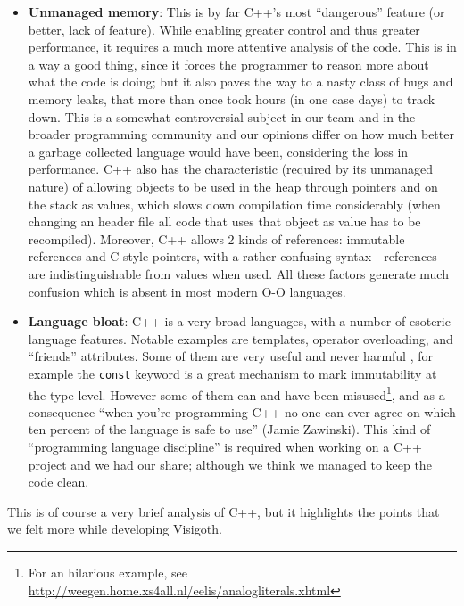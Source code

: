 \documentclass[a4paper,11pt,titlepage]{article}
\newcommand{\code}[1]{\texttt{#1}}
\begin{document}
\begin{itemize}

\item
  \textbf{Unmanaged memory}: This is by far C++'s most ``dangerous'' feature (or
  better, lack of feature). While enabling greater control and thus greater
  performance, it requires a much more attentive analysis of the code. This is
  in a way a good thing, since it forces the programmer to reason more about
  what the code is doing; but it also paves the way to a nasty class of bugs and
  memory leaks, that more than once took hours (in one case days) to track down.
  This is a somewhat controversial subject in our team and in the broader
  programming community and our opinions differ on how much better a garbage
  collected language would have been, considering the loss in performance. C++
  also has the characteristic (required by its unmanaged nature) of allowing
  objects to be used in the heap through pointers and on the stack as values,
  which slows down compilation time considerably (when changing an header file
  all code that uses that object as value has to be recompiled). Moreover, C++
  allows 2 kinds of references: immutable references and C-style pointers, with
  a rather confusing syntax - references are indistinguishable from values when
  used. All these factors generate much confusion which is absent in most modern
  O-O languages.

\item
  \textbf{Language bloat}: C++ is a very broad languages, with a number of
  esoteric language features. Notable examples are templates, operator
  overloading, and ``friends'' attributes. Some of them are very useful and
  never harmful , for example the \code{const} keyword is a great mechanism to
  mark immutability at the type-level. However some of them can and have been
  misused\footnote{For an hilarious example, see
    \url{http://weegen.home.xs4all.nl/eelis/analogliterals.xhtml}}, and as a
  consequence ``when you're programming C++ no one can ever agree on which ten
  percent of the language is safe to use'' (Jamie Zawinski). This kind of
  ``programming language discipline'' is required when working on a C++ project
  and we had our share; although we think we managed to keep the code clean.

\end{itemize}

This is of course a very brief analysis of C++, but it highlights the points
that we felt more while developing Visigoth.
\end{document}
